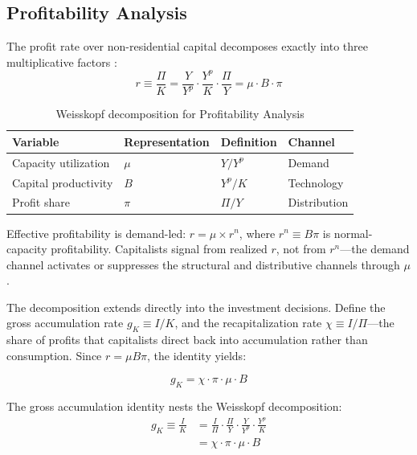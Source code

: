 \documentclass[11pt,a4paper]{article}
\begin{document}
{\subsection{Profitability Analysis}
\label{subsec:profitability_analysis}

The profit rate over non-residential capital decomposes exactly into 
three multiplicative factors \citep{Weisskopf1979}:
\begin{equation}
	r \equiv \frac{\Pi}{K} 
	= \frac{Y}{Y^p}\cdot\frac{Y^p}{K}\cdot\frac{\Pi}{Y} 
	= \mu \cdot B \cdot \pi
	\label{eq:weisskopf}
\end{equation}

\begin{table}[htbp]
	\centering
	\small
	\caption{Weisskopf decomposition for Profitability Analysis}
	\label{tab:weisskopf_factors}
	\begin{tabular}{llll}
			\toprule
			Variable & Representation & Definition & Channel \\
			\midrule
			Capacity utilization  & $\mu$  & $Y/Y^p$  & Demand\\
			Capital productivity  & $B$    & $Y^p/K$  & Technology\\
			Profit share          & $\pi$  & $\Pi/Y$  & Distribution\\
			\bottomrule
	\end{tabular}
\end{table}

Effective profitability is demand-led: $r = \mu \times r^n$, where $r^n \equiv B\pi$
is normal-capacity profitability. Capitalists signal from realized $r$, not from
$r^n$---the demand channel activates or suppresses the structural and distributive
channels through $\mu$ \citep{BleckerSetterfield2019}. 

The \citet{Weisskopf1979} decomposition extends directly into the investment
decisions. Define the gross accumulation rate $g_K \equiv I/K$, and the recapitalization
rate $\chi \equiv I/\Pi$---the share of profits that capitalists direct back into
accumulation rather than consumption. Since $r = \mu B \pi$, the identity yields:

\begin{equation}
	\label{eq:accumulation_identity}
	g_K = \chi \cdot \pi \cdot \mu \cdot B
\end{equation}

The gross accumulation identity nests the Weisskopf decomposition:
\begin{align}
	g_K \equiv \frac{I}{K}
	&= \frac{I}{\Pi}\cdot\frac{\Pi}{Y}\cdot\frac{Y}{Y^p}\cdot\frac{Y^p}{K} \\
	&= \chi \cdot \pi \cdot \mu \cdot B
\end{align}

}
\end{document}
